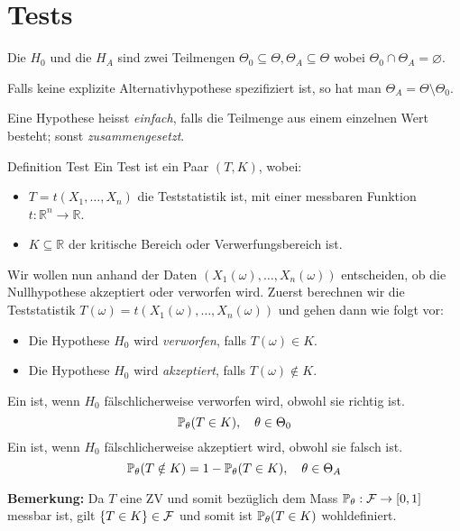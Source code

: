 \section{Tests}
\begin{subbox}{}
	Die  \(H_0\) und die  \(H_A\) sind zwei Teilmengen \(\Theta_0 \subseteq \Theta, \Theta_A \subseteq \Theta\) wobei \(\Theta_0 \cap \Theta_A = \varnothing\). 

	Falls keine explizite Alternativhypothese spezifiziert ist, so hat man $\Theta_A = \Theta \setminus \Theta_0$. 

	Eine Hypothese heisst \textit{einfach}, falls die Teilmenge aus einem einzelnen Wert besteht; sonst \textit{zusammengesetzt}.
\end{subbox}

\begin{mainbox}{Definition Test}
	Ein Test ist ein Paar $(T, K)$, wobei:
\begin{itemize}
    \item $T=t(X_1, \ldots, X_n)$ die Teststatistik ist, mit einer messbaren Funktion $t: \mathbb{R}^n \rightarrow \mathbb{R}$.
    \item $K \subseteq \mathbb{R}$ der kritische Bereich oder Verwerfungsbereich ist.
\end{itemize}
\end{mainbox}

Wir wollen nun anhand der Daten \((X_1(\omega), \ldots, X_n(\omega))\) entscheiden, ob die Nullhypothese akzeptiert oder verworfen wird. Zuerst berechnen wir die Teststatistik \(T(\omega) = t(X_1(\omega), \ldots, X_n(\omega))\) und gehen dann wie folgt vor:
\begin{itemize}
	\item Die Hypothese \(H_0\) wird \textit{verworfen}, falls \(T(\omega) \in K\).
	\item Die Hypothese \(H_0\) wird \textit{akzeptiert}, falls \(T(\omega) \notin K\).
\end{itemize}
\begin{subbox}{}
	Ein  ist, wenn \(H_0\) fälschlicherweise verworfen wird, obwohl sie richtig ist.
	\[\P_\theta(T \in K), \quad \theta \in \Theta_0\]
	\noindent Ein  ist, wenn \(H_0\) fälschlicherweise akzeptiert wird, obwohl sie falsch ist.
	\[\P_\theta(T\notin K) = 1 - \P_\theta(T \in K), \quad \theta \in \Theta_A\]
\end{subbox}
\textbf{Bemerkung: } Da $T$ eine ZV und somit bezüglich dem Mass $\P_\theta: \F \to [0,1]$ messbar ist, gilt $\{T \in K\} \in \F$ und somit ist $\P_\theta(T \in K)$ wohldefiniert. 
